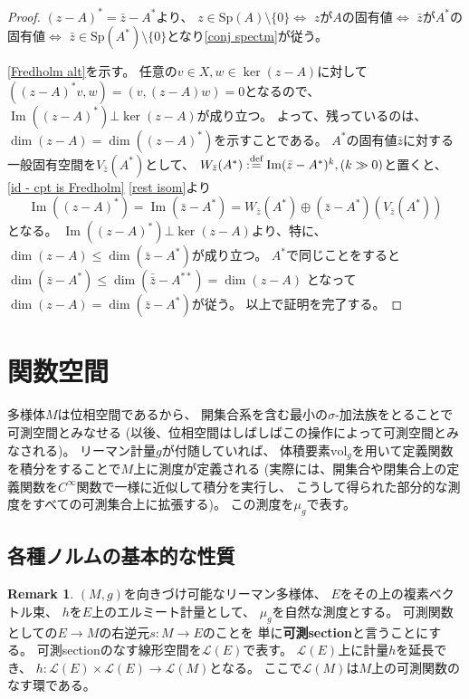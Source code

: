\documentclass[uplatex]{jsarticle}
\theoremstyle{definition}
\newtheorem{rem}[rem]{Remark}
\DeclareMathOperator{\im}{\mathrm{Im}}
\newcommand{\dfn}{:\overset{\mbox{{\scriptsize def}}}{=}}
\newcommand{\mcL}{\mathcal{L}}
\newcommand{\spectm}{\mathrm{Sp}}
\begin{document}
\begin{proof}
  \((z-A)^* = \bar{z} - A^*\)より、
  \(z\in \spectm(A)\setminus \{0\}\)\(\iff\)
  \(z\)が\(A\)の固有値\(\iff\)
  \(\bar{z}\)が\(A^*\)の固有値\(\iff\)
  \(\bar{z}\in \spectm(A^*)\setminus \{0\}\)となり\ref{conj spectm}が従う。

  \ref{Fredholm alt}を示す。
  任意の\(v\in X,w\in \ker(z-A)\)に対して
  \(((z-A)^*v,w) = (v,(z-A)w) = 0\)となるので、
  \(\im((z-A)^*)\bot \ker(z-A)\)が成り立つ。
  よって、残っているのは、\(\dim(z-A)=\dim((z-A)^*)\)を示すことである。
  \(A^*\)の固有値\(\bar{z}\)に対する一般固有空間を\(V_{\bar{z}}(A^*)\)として、
  \(W_{\bar{z}}(A^*)\dfn \im(\bar{z}-A^*)^k, (k\gg 0)\)と置くと、
  \autoref{id - cpt is Fredholm} \ref{rest isom}より
  \[\im((z-A)^*) = \im(\bar{z}-A^*) = W_{\bar{z}}(A^*) \oplus (\bar{z}-A^*)(V_{\bar{z}}(A^*))\]
  となる。
  \(\im((z-A)^*)\bot\ker(z-A)\)より、特に、
  \(\dim(z-A)\leq \dim(\bar{z}-A^*)\)が成り立つ。
  \(A^*\)で同じことをすると
  \(\dim(\bar{z}-A^*)\leq \dim(\bar{\bar{z}}-A^{**}) = \dim(z-A)\)
  となって\(\dim(z-A)=\dim(\bar{z}-A^*)\)が従う。
  以上で証明を完了する。
\end{proof}












\section{関数空間}

多様体\(M\)は位相空間であるから、
開集合系を含む最小の\(\sigma\)-加法族をとることで可測空間とみなせる
(以後、位相空間はしばしばこの操作によって可測空間とみなされる)。
リーマン計量\(g\)が付随していれば、
体積要素\(\mathrm{vol}_g\)を用いて定義関数を積分をすることで\(M\)上に測度が定義される
(実際には、開集合や閉集合上の定義関数を\(C^{\infty}\)関数で一様に近似して積分を実行し、
こうして得られた部分的な測度をすべての可測集合上に拡張する)。
この測度を\(\mu_g\)で表す。






\subsection{各種ノルムの基本的な性質}


\begin{rem}
  \((M,g)\)を向きづけ可能なリーマン多様体、
  \(E\)をその上の複素ベクトル束、
  \(h\)を\(E\)上のエルミート計量として、
  \(\mu_g\)を自然な測度とする。
  可測関数としての\(E\to M\)の右逆元\(s:M\to E\)のことを
  単に\textbf{可測section}と言うことにする。
  可測sectionのなす線形空間を\(\mcL(E)\)で表す。
  \(\mcL(E)\)上に計量\(h\)を延長でき、
  \(h: \mcL(E)\times \mcL(E) \to \mcL(M)\)となる。
  ここで\(\mcL(M)\)は\(M\)上の可測関数のなす環である。
\end{rem}
\end{document}
